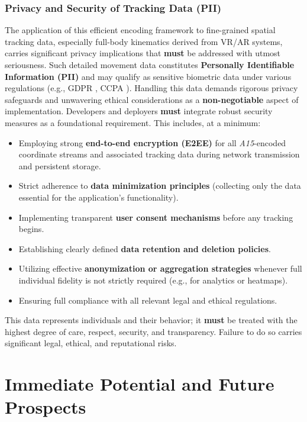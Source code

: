 \documentclass[10pt]{article}
\def\AAAB{\textit{A15}}
\begin{document}
\subsubsection{Privacy and Security of Tracking Data (PII)}\label{subsubsec:limits-privacy}
The application of this efficient encoding framework to fine-grained spatial tracking data, especially full-body kinematics derived from VR/AR systems, carries significant privacy implications that \textbf{must} be addressed with utmost seriousness. Such detailed movement data constitutes \textbf{Personally Identifiable Information (PII)} and may qualify as sensitive biometric data under various regulations (e.g., GDPR \cite{GDPR-2016}, CCPA \cite{CCPA-2018}). Handling this data demands rigorous privacy safeguards and unwavering ethical considerations as a \textbf{non-negotiable} aspect of implementation. Developers and deployers \textbf{must} integrate robust security measures as a foundational requirement. This includes, at a minimum:
\begin{itemize} \itemsep0pt
    \item Employing strong \textbf{end-to-end encryption (E2EE)} for all \AAAB{}-encoded coordinate streams and associated tracking data during network transmission and persistent storage.
    \item Strict adherence to \textbf{data minimization principles} (collecting only the data essential for the application's functionality).
    \item Implementing transparent \textbf{user consent mechanisms} before any tracking begins.
    \item Establishing clearly defined \textbf{data retention and deletion policies}.
    \item Utilizing effective \textbf{anonymization or aggregation strategies} whenever full individual fidelity is not strictly required (e.g., for analytics or heatmaps).
    \item Ensuring full compliance with all relevant legal and ethical regulations.
\end{itemize}
This data represents individuals and their behavior; it \textbf{must} be treated with the highest degree of care, respect, security, and transparency. Failure to do so carries significant legal, ethical, and reputational risks.

\section{Immediate Potential and Future Prospects}\label{sec:outlook}
\end{document}
